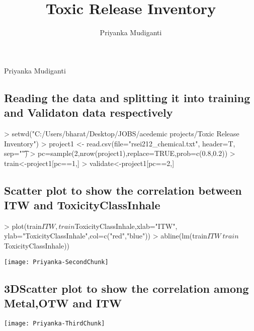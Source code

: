 \documentclass{article}
\title{Toxic Release Inventory}
\author{Priyanka Mudiganti}
\begin{document}

\begin{center}
{\Large Priyanka Mudiganti}
\end{center}

\subsection*{Reading the data and splitting it into training and Validaton data respectively}
\begin{Schunk}
\begin{Sinput}
> setwd("C:/Users/bharat/Desktop/JOBS/acedemic projects/Toxic Release Inventory") 
> project1 <- read.csv(file="rsei212_chemical.txt", header=T, sep="\t")
> pc=sample(2,nrow(project1),replace=TRUE,prob=c(0.8,0.2))
> train<-project1[pc==1,]
> validate<-project1[pc==2,]
\end{Sinput}
\end{Schunk}
\subsection*{Scatter plot to show the correlation between ITW and ToxicityClassInhale}
\begin{Schunk}
\begin{Sinput}
> plot(train$ITW,train$ToxicityClassInhale,xlab="ITW", ylab="ToxicityClassInhale",col=c("red","blue"))
> abline(lm(train$ITW ~ train$ToxicityClassInhale))
\end{Sinput}
\end{Schunk}
\texttt{[image: Priyanka-SecondChunk]}
\subsection*{3DScatter plot to show the correlation among Metal,OTW and ITW }
\begin{Schunk}
\end{Schunk}
\texttt{[image: Priyanka-ThirdChunk]}
\end{document}
